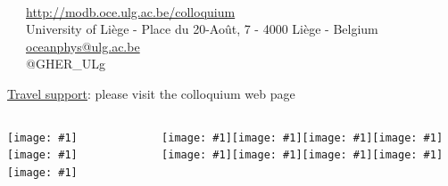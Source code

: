 \documentclass[final,table,14pt,aspectratio=141]{beamer}
\newcommand{\seplogo}{\hspace{.35cm}}
\newcommand{\putlogo}[1]{\texttt{[image: \#1]}}
\newcommand{\putlogoB}[1]{\texttt{[image: \#1]}}
\begin{document}
\begin{frame}[fragile]
\vspace{-0.02\textheight}
{ \rmfamily \tiny
\textcolor{greygher}{\faCalendarCheckO~~~\insertdate}\\
\textcolor{bluegher}{{\ComputerMouse}~~~\url{http://modb.oce.ulg.ac.be/colloquium}}\\
\textcolor{greygher}{\faHome~~~University of Liège - Place du 20-Août, 7 - 4000 Liège - Belgium}\\ 
\textcolor{bluegher}{\Letter}~~~\href{mailto:oceanphys@ulg.ac.be}{oceanphys@ulg.ac.be}\\
\textcolor{greygher}{\faTwitter~~~@GHER\_ULg}\\
}

\vspace{.05cm}
{\scriptsize 
{}
}

{\scriptsize 
\href{http://modb.oce.ulg.ac.be/colloquium/2016/#col_travel_grants}{Travel support}: please visit the colloquium web page
}

\vfill

\begin{columns}[totalwidth=1.\textwidth,c]

\scriptsize


\putlogo{logo_gher2}\seplogo\putlogo{logo_imedea}\seplogo\putlogo{logo_whoi} %

~

\scriptsize
\putlogo{coq_wallon}\seplogo\putlogo{logo_IOC}\seplogo\putlogo{logoSocib}\seplogo\putlogo{logo_CNES}\seplogo\putlogo{logo_esa}\seplogo \putlogo{logo_nasa}\seplogo\putlogo{logo_onr}\seplogo\putlogo{logo_iugg}%

\end{columns}

\end{frame}
\end{document}
